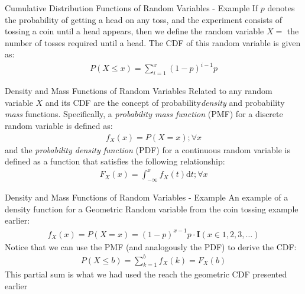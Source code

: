 \documentclass{beamer}
\begin{document}
\begin{frame}{Cumulative Distribution Functions of Random Variables - Example}
If $p$ denotes the probability of getting a head on any toss, and the experiment consists of tossing a coin until a head appears, then we define the random variable $X = $ the number of tosses required until a head. The CDF of this random variable is given as:
\begin{align*}
P(X \leq x) = \sum_{i = 1}^{x} (1-p)^{i-1}p
\end{align*}
\end{frame}
 
\begin{frame}{Density and Mass Functions of Random Variables}
Related to any random variable $X$ and its CDF are the concept of probability\emph{density} and probability \emph{mass} functions. Specifically, a \emph{probability mass function} (PMF) for a discrete random variable is defined as:
\begin{align*}
f_{X}(x) = P(X = x); \forall x
\end{align*}
and the \emph{probability density function} (PDF) for a continuous random variable is defined as a function that satisfies the following relationship:
\begin{align*}
F_{X}(x) = \int_{-\infty}^{x}f_{X}(t) \mathrm{d}t; \forall x
\end{align*}
\end{frame}

\begin{frame}{Density and Mass Functions of Random Variables - Example}
An example of a density function for a Geometric Random variable from the coin tossing example earlier:
\begin{align*}
f_{X}(x) = P(X = x) = (1-p)^{x-1}p \cdot \textbf{I}(x\in{1,2,3,\ldots})
\end{align*}
Notice that we can use the PMF (and analogously the PDF) to derive the CDF:
\begin{align*}
P(X\leq b) = \sum_{k = 1}^{b}f_{X}(k) = F_{X}(b)
\end{align*}
This partial sum is what we had used the reach the geometric CDF presented earlier
\end{frame}
\end{document}

